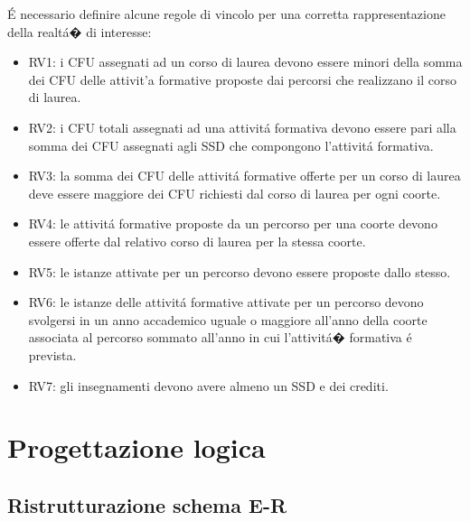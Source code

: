 \documentclass[a4paper,12pt,italian,towside]{article}
\begin{document}
\'E necessario definire alcune regole di vincolo per una corretta rappresentazione della realt\'a� di interesse:
\begin{itemize}
	\item RV1: i CFU assegnati ad un corso di laurea devono essere minori della somma dei CFU delle attivit'a formative proposte dai percorsi che realizzano il corso di laurea.
	\item RV2: i CFU totali assegnati ad una attivit\'a formativa devono essere pari alla somma dei CFU assegnati agli SSD che compongono l'attivit\'a formativa.
	\item RV3: la somma dei CFU delle attivit\'a formative offerte per un corso di laurea deve essere maggiore dei CFU richiesti dal corso di laurea per ogni coorte.
	\item RV4: le attivit\'a formative proposte da un percorso per una coorte devono essere offerte dal relativo corso di laurea per la stessa coorte.
	\item RV5: le istanze attivate per un percorso devono essere proposte dallo stesso. 
	\item RV6: le istanze delle attivit\'a formative attivate per un percorso devono svolgersi in un anno accademico uguale o maggiore all'anno della coorte associata al percorso sommato all'anno in cui l'attivit\'a� formativa \'e prevista.
	\item RV7: gli insegnamenti devono avere almeno un SSD e dei crediti.
\end{itemize}

\newpage
\section{Progettazione logica}

\subsection{Ristrutturazione schema E-R}
\end{document}
